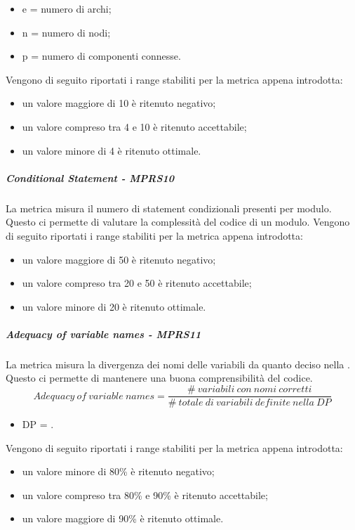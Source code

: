 \documentclass[../PianoDiQualifica.tex]{subfiles}
\begin{document}
			\begin{itemize}
				\item e = numero di archi;
				\item n = numero di nodi;
				\item p = numero di componenti connesse.
		    \end{itemize}
			Vengono di seguito riportati i range stabiliti per la metrica appena introdotta:
			\begin{itemize}
				\item un valore maggiore di 10 è ritenuto negativo;
				\item un valore compreso tra 4 e 10 è ritenuto accettabile;
				\item un valore minore di 4 è ritenuto ottimale.
			\end{itemize}
			\subparagraph{Conditional Statement - MPRS10}\label{MPRS10}
			La metrica misura il numero di statement condizionali presenti per modulo. Questo ci permette di valutare la complessità del codice di un modulo.  
			Vengono di seguito riportati i range stabiliti per la metrica appena introdotta:
			\begin{itemize}
				\item un valore maggiore di 50 è ritenuto negativo;
				\item un valore compreso tra 20 e 50 è ritenuto accettabile;
				\item un valore minore di 20 è ritenuto ottimale.
			\end{itemize}
			\subparagraph{Adequacy of variable names - MPRS11}\label{MPRS11}
			La metrica misura la divergenza dei nomi delle variabili da quanto deciso nella . Questo ci permette di mantenere una buona comprensibilità del codice. 
			\begin{equation}
			Adequacy \ of \ variable \ names=\frac{\#\ variabili \ con \ nomi \ corretti}{\# \ totale \ di \ variabili \ definite \ nella \ DP }
			\end{equation}
			\begin{itemize}
				\item DP = .
			\end{itemize}
			Vengono di seguito riportati i range stabiliti per la metrica appena introdotta:
			\begin{itemize}
				\item un valore minore di 80\% è ritenuto negativo;
				\item un valore compreso tra 80\% e 90\% è ritenuto accettabile;
				\item un valore maggiore di 90\% è ritenuto ottimale.
			\end{itemize}
\end{document}
